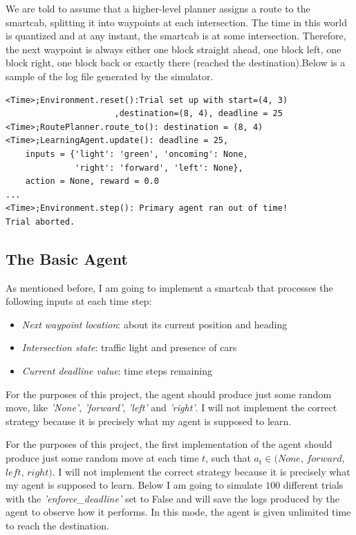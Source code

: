 \documentclass[a4paper]{article}
\begin{document}
We are told to assume that a higher-level planner assigns a route to the smartcab, splitting it into waypoints at each intersection. The time in this world is quantized and at any instant, the smartcab is at some intersection. Therefore, the next waypoint is always either one block straight ahead, one block left, one block right, one block back or exactly there (reached the destination).Below is a sample of the log file generated by the simulator.

\begin{lstlisting}
<Time>;Environment.reset():Trial set up with start=(4, 3)
                      ,destination=(8, 4), deadline = 25
<Time>;RoutePlanner.route_to(): destination = (8, 4)
<Time>;LearningAgent.update(): deadline = 25,
    inputs = {'light': 'green', 'oncoming': None,
              'right': 'forward', 'left': None},
    action = None, reward = 0.0
...
<Time>;Environment.step(): Primary agent ran out of time!
Trial aborted.
\end{lstlisting}

\subsection{The Basic Agent}
As mentioned before, I am going to implement a smartcab that processes the following inputs at each time step:

\begin{itemize}
\item \textit{Next waypoint location}: about its current position and heading
\item \textit{Intersection state}: traffic light and presence of cars
\item \textit{Current deadline value}: time steps remaining
\end{itemize}

For the purposes of this project, the agent should produce just some random move, like \textit{'None'}, \textit{'forward'}, \textit{'left'} and \textit{'right'}. I will not implement the correct strategy because it is precisely what my agent is supposed to learn.

For the purposes of this project, the first implementation of the agent should produce just some random move at each time $t$, such that $a_t \in (None,\, forward,\,$
$ left,\, right)$. I will not implement the correct strategy because it is precisely what my agent is supposed to learn. Below I am going to simulate $100$ different trials with the \textit{'enforce\_deadline'} set to False and will save the logs produced by the agent to observe how it performs. In this mode, the agent is given unlimited time to reach the destination.
\end{document}
